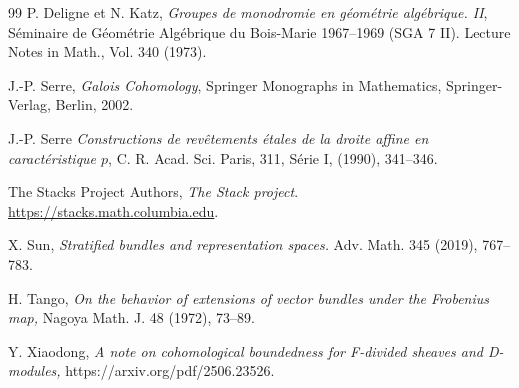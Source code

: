 \documentclass[12pt,a4]{amsart}
\theoremstyle{definition}
\begin{document}
\begin{thebibliography}{99}
P. Deligne et N. Katz, 
\textit{Groupes de monodromie en g\'eom\'etrie alg\'ebrique. II},  
S\'eminaire de G\'eom\'etrie Alg\'ebrique du Bois-Marie 1967--1969 (SGA 7 II).   
Lecture Notes in Math., Vol. 340 (1973).  

J.-P. Serre,
\emph{Galois Cohomology},
Springer Monographs in Mathematics,
Springer-Verlag, Berlin, 2002.

 J.-P. Serre  \textit{Constructions de rev\^etements \'etales de la droite affine en caract\'eristique $p$}, C. R. Acad. Sci. Paris, 311, S\'erie I, (1990), 341--346.

 The Stacks Project Authors, \textit{The Stack project}. \url{https://stacks.math.columbia.edu}.

 X. Sun,  
\textit{Stratified bundles and representation spaces.} 
Adv. Math. 345 (2019), 767--783.

 H. Tango,  \textit{On the behavior of extensions of vector bundles under the Frobenius map,}
Nagoya Math. J. 48 (1972), 73--89.

 Y. Xiaodong, \textit{A note on cohomological boundedness for F-divided sheaves and D-modules,} https://arxiv.org/pdf/2506.23526.


\end{thebibliography}
\end{document}
